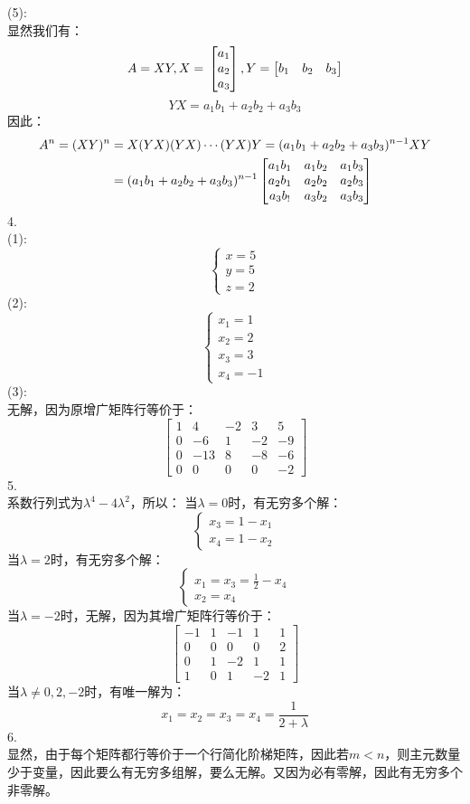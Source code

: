 \documentclass[utf8]{ctexart}
\begin{document}
(5):\\
显然我们有：
\[A=XY,
X=\\
\begin{bmatrix}
	a_1\\
	a_2\\
	a_3
\end{bmatrix},
Y=
\begin{bmatrix}
	b_1&b_2&b_3
\end{bmatrix}\]
\[YX=a_1b_1+a_2b_2+a_3b_3\]
因此：
\begin{align}
	A^n=(XY)^n&=X(YX)(YX)\cdots(YX)Y=(a_1b_1+a_2b_2+a_3b_3)^{n-1}XY\notag\\
	&=(a_1b_1+a_2b_2+a_3b_3)^{n-1}\begin{bmatrix}
		a_1b_1&a_1b_2&a_1b_3\\
		a_2b_1&a_2b_2&a_2b_3\\
		a_3b_!&a_3b_2&a_3b_3
	\end{bmatrix}\notag
\end{align}
4.\\
(1):\\
\[\begin{cases}
	x=5\\
	y=5\\
	z=2
\end{cases}\]
(2):\\
\[\begin{cases}
	x_1=1\\
	x_2=2\\
	x_3=3\\
	x_4=-1
\end{cases}\]
(3):\\
无解，因为原增广矩阵行等价于：
\[\begin{bmatrix}
	1&4&-2&3&5\\
	0&-6&1&-2&-9\\
	0&-13&8&-8&-6\\
	0&0&0&0&-2
\end{bmatrix}\]
5.\\
系数行列式为$\lambda^4-4\lambda^2$，所以：
当$\lambda=0$时，有无穷多个解：
\[\begin{cases}
	x_3=1-x_1\\
	x_4=1-x_2
\end{cases}\]
当$\lambda=2$时，有无穷多个解：
\[\begin{cases}
	x_1=x_3=\frac{1}{2}-x_4\\
	x_2=x_4
\end{cases}\]
当$\lambda=-2$时，无解，因为其增广矩阵行等价于：
\[\begin{bmatrix}
	-1&1&-1&1&1\\
	0&0&0&0&2\\
	0&1&-2&1&1\\
	1&0&1&-2&1
\end{bmatrix}\]
当$\lambda\neq0,2,-2$时，有唯一解为：
\[x_1=x_2=x_3=x_4=\frac{1}{2+\lambda}\]
6.\\
显然，由于每个矩阵都行等价于一个行简化阶梯矩阵，因此若$m<n$，则主元数量少于变量，因此要么有无穷多组解，要么无解。又因为必有零解，因此有无穷多个非零解。
\end{document}
